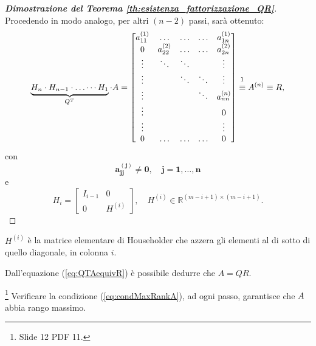\begin{proof}[\textbf{Dimostrazione del Teorema \ref{th:esistenza_fattorizzazione_QR}}]
    Procedendo in modo analogo, per altri $(n-2)$ passi, sarà ottenuto:
    \begin{equation}\label{eq:QTAequivR}
        \underbrace{H_n\cdot H_{n-1}\cdot\hdots\cdots H_1}_{Q^T}\cdot A =
        \begin{bmatrix}
            a_{11}^{(1)} &\hdots & \hdots & \hdots & a_{1n}^{(1)}\\
            0 & a_{22}^{(2)} & \hdots & \hdots & a_{2n}^{(2)}\\
            \vdots & \ddots & \ddots & & \vdots \\
            \vdots & & \ddots & \ddots & \vdots\\
            \vdots & & & \ddots & a_{nn}^{(n)}\\
            \vdots & & & & 0\\
            \vdots & & & & \vdots\\
            0 & \hdots & \hdots & \hdots & 0
        \end{bmatrix}\overset{\footnotemark}{\equiv} A^{(n)}\equiv R,
    \end{equation}
    \noindent con
    \begin{equation}\label{eq:condMaxRankA}
        \boldsymbol{a_{jj}^{(j)}\neq0,\quad j=1,\hdots, n}
    \end{equation}
    e
    \begin{equation*}
        H_i=
        \left[\begin{array}{c|c}
             I_{i-1}& 0 \\
             \hline
             0 & H^{(i)}
        \end{array}\right],\quad H^{(i)}\in\mathbb R^{(m-i+1)\times(m-i+1)}.
    \end{equation*}
\end{proof}

\begin{remark}
    $H^{(i)}$ è la matrice elementare di Householder che azzera gli elementi al di sotto di quello diagonale, in colonna $i$.
\end{remark}

\begin{remark}
    Dall'equazione (\ref{eq:QTAequivR}) è possibile dedurre che $A=QR$.
\end{remark}

\begin{remark}\footnote{Slide 12 PDF 11.}
    Verificare la condizione (\ref{eq:condMaxRankA}), ad ogni passo, garantisce che $A$ abbia rango massimo.
\end{remark}

